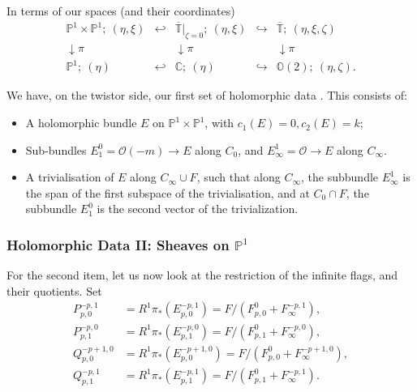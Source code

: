 \documentclass[12pt]{article}
\theoremstyle{definition}
\theoremstyle{remark}
\numberwithin{theorem}{section}
\def\bC{{\mathbb {C}}}
\def\bP{{\mathbb {P}}}
\def\bO{{\mathbb {O}}}
\def\bT{{\mathbb {T}}}
\def\pO{{\mathcal O}}
\begin{document}
In terms of our spaces (and their coordinates) 
\begin{equation}
\begin{matrix} \bP^1\times \bP^1; \  (\eta, \xi)& \hookleftarrow &\overline{\bT}|_{\zeta = 0}; \ (\eta,\xi)&\hookrightarrow& \overline{\bT}; \ (\eta,\xi, \zeta)\\
\downarrow\pi&&\downarrow\pi&&\downarrow\pi\\
\bP^1; \ (\eta)&\hookleftarrow &\bC;\ (\eta)&\hookrightarrow &\bO(2); \ (\eta,  \zeta).\end{matrix}\end{equation}



 We have, on the twistor side, our first set of holomorphic data \cite{Charbonneau:2006gu}. 
This consists of:

\begin{itemize} \item A holomorphic bundle $E$ on $\bP^1\times \bP^1$, with $c_1(E) = 0, c_2(E) = k$; 
\item  Sub-bundles $E^0_1 = \pO(-m) \rightarrow E$ along $C_0$, and $E_\infty^1= \pO  \rightarrow E$ along $C_\infty$.
\item A trivialisation of $E$ along $C_\infty\cup  F$, such that along $C_\infty$, the subbundle $E_\infty^1$ is the span of the first subspace of the trivialisation, and at $C_0\cap  F$, the   subbundle $E^0_1$ is the second vector of the trivialization.
\end{itemize}



\subsubsection{Holomorphic Data II: Sheaves   on $\bP^1$}


For the second item, let us now look at the restriction of the infinite flags, and their quotients. Set 
\begin{align}  P_{p,0}^{-p,1}&= R^1 \pi_*(E_{p,0}^{-p,1}) = F/(F^0_{p,0}+F_\infty^{-p,1}),\\
 P_{p,1}^{-p,0}& = R^1 \pi_*(E_{p,1}^{-p,0})= F/(F^0_{p,1}+F_\infty^{-p,0}), \nonumber\\
Q_{p,0}^{-p+1,0}  &= R^1 \pi_*(E_{p,0}^{-p+1,0})= F/(F^0_{p,0}+F_\infty^{-p+1, 0}), \nonumber\\
 Q_{p,1}^{-p ,1}&= R^1 \pi_*(E_{p,1}^{-p ,1})=  F/(F^0_{p,1}+F_\infty^{-p,1}).\nonumber\end{align}
 
\end{document}
